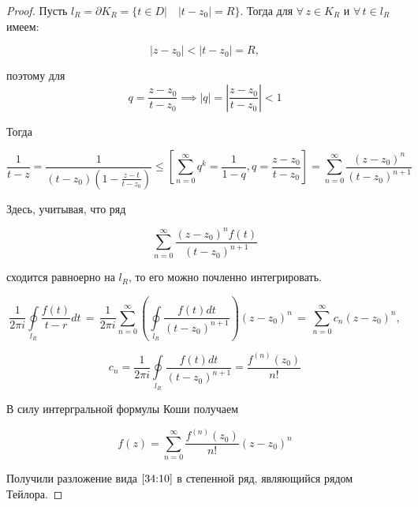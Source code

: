 \documentclass[../../main.tex]{subfiles}
\begin{document}
\begin{proof}
	Пусть $ l_R = \partial K_R = \{t \in D | \quad |t - z_0| = R \} $. Тогда для 
	$ \forall\, z \in K_R $ и $ \forall\, t \in l_R $ имеем:
	
	\[ |z - z_0| < |t - z_0| = R, \]
	
	поэтому для \[ q = \frac{z - z_0}{t - z_0} \implies |q | = |\frac{z - z_0}{t 
	- z_0}| < 1 \]
	
	Тогда
	
	\[ \frac{1}{t - z} = \frac{1}{(t - z_0)(1 - \frac{z - t}{t - z_0})} \leq 
	\left[ \sum\limits_{n = 0}^{\infty}q^k = \frac{1}{1 - q}, q = \frac{z - 
	z_0}{t - z_0} \right] = \sum\limits_{n = 0}^{\infty}\frac{(z - z_0)^n}{(t - 
	z_0)^{n + 1}} \]
	
	Здесь, учитывая, что ряд
	
	\[ \sum\limits_{n = 0}^{\infty}\frac{(z - z_0)^n f(t)}{(t - z_0)^{n + 1}} \]
	
	сходится равноерно на $ l_R $, то его можно почленно интегрировать.
	
	\[ \frac{1}{2 \pi i} \underset{l_R}\oint \frac{f(t)}{t - r} dt\, =\, 
	\frac{1}{2 \pi i} \sum\limits_{n = 0}^{\infty} \left( 
	\underset{l_R}\oint\frac{f(t)dt}{(t - z_0)^{n + 1}} \right)(z - z_0)^n\, =\, 
	\sum\limits_{n = 0}^{\infty} c_n (z - z_0)^n, \]
	
	\[ c_n = \frac{1}{2 \pi i} \underset{l_R}\oint\frac{f(t)dt}{(t - z_0)^{n + 
	1}} = \frac{f^{(n)}(z_0)}{n!} \]
	
	В силу интергральной формулы Коши получаем
	
	\[ f(z) = \sum\limits_{n = 0}^{\infty} \frac{f^{(n)}(z_0)}{n!} (z - z_0)^n \]
	
	Получили разложение вида $ \eqref{34:10} $ в степенной ряд, являющийся рядом 
	Тейлора.
 \end{proof}
\end{document}
